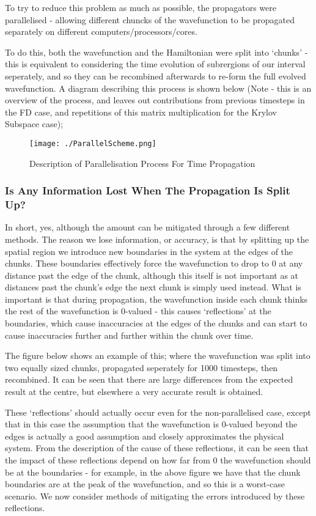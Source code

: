 To try to reduce this problem as much as possible, the propagators were parallelised - allowing different chuncks of the wavefunction to be propagated separately on different computers/processors/cores. 

To do this, both the wavefunction and the Hamiltonian were split into `chunks' - this is equivalent to considering the time evolution of subrergions of our interval seperately, and so they can be recombined afterwards to re-form the full evolved wavefunction. A diagram describing this process is shown below (Note - this is an overview of the process, and leaves out contributions from previous timesteps in the FD case, and repetitions of this matrix multiplication for the Krylov Subspace case);

\begin{figure}[H]
         \texttt{[image: ./ParallelScheme.png]}
         \centering
         \caption{Description of Parallelisation Process For Time Propagation}
\end{figure}



\subsubsection{Is Any Information Lost When The Propagation Is Split Up?}
In short, yes, although the amount can be mitigated through a few different methods. The reason we lose information, or accuracy, is that by splitting up the spatial region we introduce new boundaries in the system at the edges of the chunks. These boundaries effectively force the wavefunction to drop to 0 at any distance past the edge of the chunk, although this itself is not important as at distances past the chunk's edge the next chunk is simply used instead. What is important is that during propagation, the wavefunction inside each chunk thinks the rest of the wavefunction is 0-valued - this causes `reflections' at the boundaries, which cause inaccuracies at the edges of the chunks and can start to cause inaccuracies further and further within the chunk over time. 

The figure below shows an example of this; where the wavefunction was split into two equally sized chunks, propagated seperately for 1000 timesteps, then recombined. It can be seen that there are large differences from the expected result at the centre, but elsewhere a very accurate result is obtained.



These `reflections' should actually occur even for the non-parallelised case, except that in this case the assumption that the wavefunction is 0-valued beyond the edges is actually a good assumption and closely approximates the physical system. From the description of the cause of these reflections, it can be seen that the impact of these reflections depend on how far from 0 the wavefunction should be at the boundaries - for example, in the above figure we have that the chunk boundaries are at the peak of the wavefunction, and so this is a worst-case scenario. We now consider methods of mitigating the errors introduced by these reflections.

